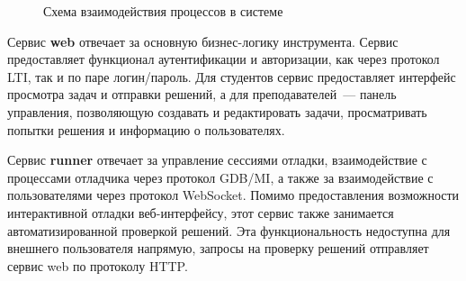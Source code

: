 \documentclass[a4paper,article,14pt]{extarticle}
\begin{document}
\begin{figure}[h]
    \begin{center}
        \caption{\label{fig:processes_arch} Схема взаимодействия процессов в системе}
    \end{center}
\end{figure}

Сервис \textbf{web} отвечает за основную бизнес-логику инструмента. Сервис предоставляет функционал аутентификации и авторизации, как через протокол LTI, так и по паре логин/пароль. Для студентов сервис предоставляет интерфейс просмотра задач и отправки решений, а для преподавателей~--- панель управления, позволяющую создавать и редактировать задачи, просматривать попытки решения и информацию о пользователях.

Сервис \textbf{runner} отвечает за управление сессиями отладки, взаимодействие с процессами отладчика через протокол GDB/MI, а также за взаимодействие с пользователями через протокол WebSocket. Помимо предоставления возможности интерактивной отладки веб-интерфейсу, этот сервис также занимается автоматизированной проверкой решений. Эта функциональность недоступна для внешнего пользователя напрямую, запросы на проверку решений отправляет сервис web по протоколу HTTP.
\end{document}
